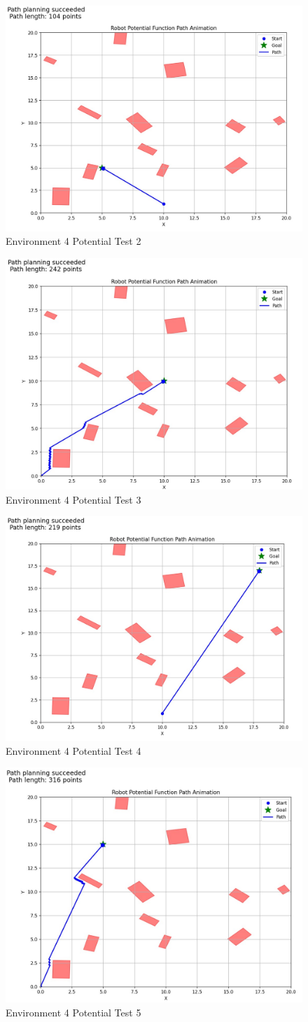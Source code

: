 \documentclass{article}
\begin{document}
\begin{figure} [H]
    \centering
    \includegraphics[width=0.5\linewidth]{latex_media/Env4PotentialTest2.jpg}
    \caption{Environment 4 Potential Test 2}
\end{figure}

\begin{figure} [H]
    \centering
    \includegraphics[width=0.5\linewidth]{latex_media/Env4PotentialTest3.jpg}
    \caption{Environment 4 Potential Test 3}
\end{figure}

\begin{figure} [H]
    \centering
    \includegraphics[width=0.5\linewidth]{latex_media/Env4PotentialTest4.jpg}
    \caption{Environment 4 Potential Test 4}
\end{figure}

\begin{figure} [H]
    \centering
    \includegraphics[width=0.5\linewidth]{latex_media/Env4PotentialTest5.jpg}
    \caption{Environment 4 Potential Test 5}
\end{figure}
\end{document}
